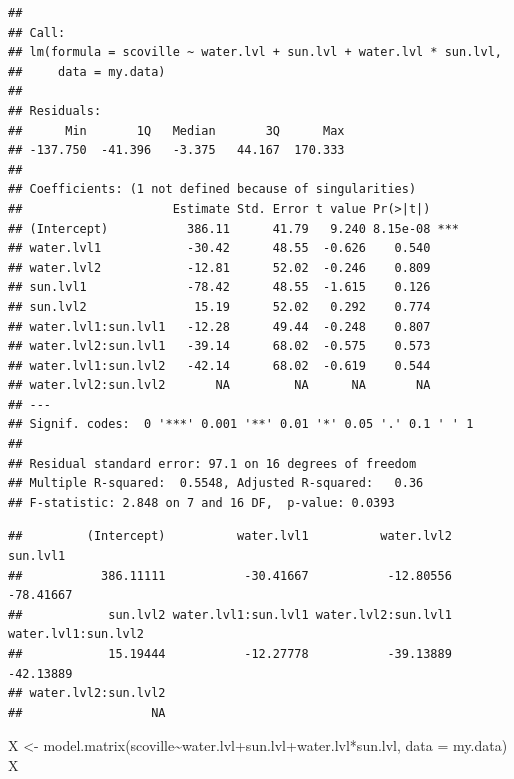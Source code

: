 \documentclass[
]{book}
\newenvironment{Shaded}{\begin{snugshade}}{\end{snugshade}}
\newcommand{\AttributeTok}[1]{\textcolor[rgb]{0.77,0.63,0.00}{#1}}
\newcommand{\FunctionTok}[1]{\textcolor[rgb]{0.00,0.00,0.00}{#1}}
\newcommand{\NormalTok}[1]{#1}
\newcommand{\OtherTok}[1]{\textcolor[rgb]{0.56,0.35,0.01}{#1}}
\newcommand{\SpecialCharTok}[1]{\textcolor[rgb]{0.00,0.00,0.00}{#1}}
\begin{document}
\begin{verbatim}
## 
## Call:
## lm(formula = scoville ~ water.lvl + sun.lvl + water.lvl * sun.lvl, 
##     data = my.data)
## 
## Residuals:
##      Min       1Q   Median       3Q      Max 
## -137.750  -41.396   -3.375   44.167  170.333 
## 
## Coefficients: (1 not defined because of singularities)
##                     Estimate Std. Error t value Pr(>|t|)    
## (Intercept)           386.11      41.79   9.240 8.15e-08 ***
## water.lvl1            -30.42      48.55  -0.626    0.540    
## water.lvl2            -12.81      52.02  -0.246    0.809    
## sun.lvl1              -78.42      48.55  -1.615    0.126    
## sun.lvl2               15.19      52.02   0.292    0.774    
## water.lvl1:sun.lvl1   -12.28      49.44  -0.248    0.807    
## water.lvl2:sun.lvl1   -39.14      68.02  -0.575    0.573    
## water.lvl1:sun.lvl2   -42.14      68.02  -0.619    0.544    
## water.lvl2:sun.lvl2       NA         NA      NA       NA    
## ---
## Signif. codes:  0 '***' 0.001 '**' 0.01 '*' 0.05 '.' 0.1 ' ' 1
## 
## Residual standard error: 97.1 on 16 degrees of freedom
## Multiple R-squared:  0.5548, Adjusted R-squared:   0.36 
## F-statistic: 2.848 on 7 and 16 DF,  p-value: 0.0393
\end{verbatim}

\begin{Shaded}
\end{Shaded}

\begin{verbatim}
##         (Intercept)          water.lvl1          water.lvl2            sun.lvl1 
##           386.11111           -30.41667           -12.80556           -78.41667 
##            sun.lvl2 water.lvl1:sun.lvl1 water.lvl2:sun.lvl1 water.lvl1:sun.lvl2 
##            15.19444           -12.27778           -39.13889           -42.13889 
## water.lvl2:sun.lvl2 
##                  NA
\end{verbatim}

\begin{Shaded}
\begin{Highlighting}[]
\NormalTok{X }\OtherTok{\textless{}{-}} \FunctionTok{model.matrix}\NormalTok{(scoville}\SpecialCharTok{\textasciitilde{}}\NormalTok{water.lvl}\SpecialCharTok{+}\NormalTok{sun.lvl}\SpecialCharTok{+}\NormalTok{water.lvl}\SpecialCharTok{*}\NormalTok{sun.lvl, }\AttributeTok{data =}\NormalTok{ my.data)}
\NormalTok{X}
\end{Highlighting}
\end{Shaded}
\end{document}
